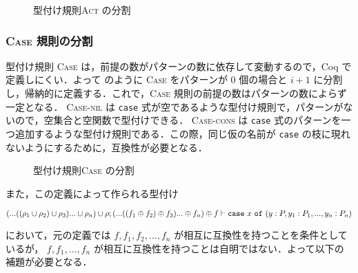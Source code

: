 \begin{figure}[t]
  \vspace{14pt}
  \vspace{14pt}
  \vspace{14pt}

  \caption{型付け規則\textsc{Act} の分割}
  \label{coq:act}
\end{figure}


\subsubsection{\textsc{Case} 規則の分割}

型付け規則 \textsc{Case} は，前提の数がパターンの数に依存して変動するので，Coq で定義しにくい．よって  のように \textsc{Case} をパターンが $0$ 個の場合と $i + 1$ に分割し，帰納的に定義する．これで，\textsc{Case} 規則の前提の数はパターンの数によらず一定となる．
\textsc{Case-nil} は \texttt{case} 式が空であるような型付け規則で，パターンがないので，空集合と空関数で型付けできる．
\textsc{Case-cons} は \texttt{case} 式のパターンを一つ追加するような型付け規則である．この際，同じ仮の名前が \texttt{case} の枝に現れないようにするために，互換性が必要となる．

\begin{figure}[t]
  \vspace{14pt}

  \caption{型付け規則\textsc{Case} の分割}
  \label{api:case_split}
\end{figure}


また，この定義によって作られる型付け
\begin{center}
  $(...((\rho_1 \cup \rho_2) \cup \rho_3)... \cup \rho_n) \cup \rho ; (...((f_1 \oplus f_2) \oplus f_3)... \oplus f_n) \oplus f \vdash {\tt case} \ x \ {\tt of} \ (y : P, y_1 : P_1, ..., y_n : P_n)$
\end{center}
において，元の定義では $f, f_1, f_2, ..., f_n$ が相互に互換性を持つことを条件としているが，
$f, f_1, ..., f_n$ が相互に互換性を持つことは自明ではない．よって以下の補題が必要となる．

